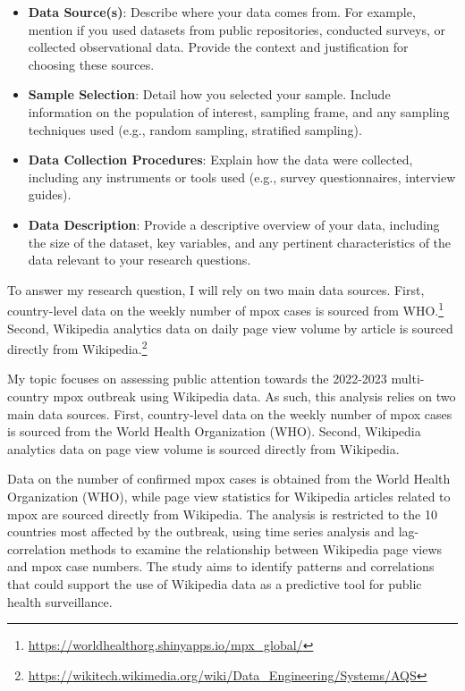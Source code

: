 \documentclass[
  12pt,
]{article}
\begin{document}
\begin{itemize}
\item
  \textbf{Data Source(s)}: Describe where your data comes from. For
  example, mention if you used datasets from public repositories,
  conducted surveys, or collected observational data. Provide the
  context and justification for choosing these sources.
\item
  \textbf{Sample Selection}: Detail how you selected your sample.
  Include information on the population of interest, sampling frame, and
  any sampling techniques used (e.g., random sampling, stratified
  sampling).
\item
  \textbf{Data Collection Procedures}: Explain how the data were
  collected, including any instruments or tools used (e.g., survey
  questionnaires, interview guides).
\item
  \textbf{Data Description}: Provide a descriptive overview of your
  data, including the size of the dataset, key variables, and any
  pertinent characteristics of the data relevant to your research
  questions.
\end{itemize}

To answer my research question, I will rely on two main data sources.
First, country-level data on the weekly number of mpox cases is sourced
from WHO.\footnote{\url{https://worldhealthorg.shinyapps.io/mpx_global/}}
Second, Wikipedia analytics data on daily page view volume by article is
sourced directly from Wikipedia.\footnote{\url{https://wikitech.wikimedia.org/wiki/Data_Engineering/Systems/AQS}}

My topic focuses on assessing public attention towards the 2022-2023
multi-country mpox outbreak using Wikipedia data. As such, this analysis
relies on two main data sources. First, country-level data on the weekly
number of mpox cases is sourced from the World Health Organization
(WHO). Second, Wikipedia analytics data on page view volume is sourced
directly from Wikipedia.

Data on the number of confirmed mpox cases is obtained from the World
Health Organization (WHO), while page view statistics for Wikipedia
articles related to mpox are sourced directly from Wikipedia. The
analysis is restricted to the 10 countries most affected by the
outbreak, using time series analysis and lag-correlation methods to
examine the relationship between Wikipedia page views and mpox case
numbers. The study aims to identify patterns and correlations that could
support the use of Wikipedia data as a predictive tool for public health
surveillance.
\end{document}
